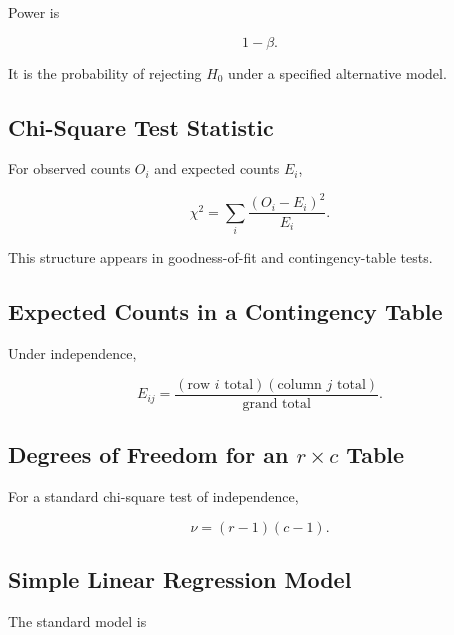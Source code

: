 Power is

\[
\boxed{
1-\beta.
}
\]

It is the probability of rejecting \(H_0\) under a specified alternative
model.

\subsection{Chi-Square Test Statistic}
\label{subsec:chi-square-test-statistic}

For observed counts \(O_i\) and expected counts \(E_i\),

\[
\boxed{
\chi^2
=
\sum_i
\frac{
(O_i-E_i)^2
}{
E_i
}.
}
\]

This structure appears in goodness-of-fit and contingency-table tests.

\subsection{Expected Counts in a Contingency Table}
\label{subsec:contingency-expected-count}

Under independence,

\[
\boxed{
E_{ij}
=
\frac{
(\text{row }i\text{ total})
(\text{column }j\text{ total})
}{
\text{grand total}
}.
}
\]

\subsection{Degrees of Freedom for an \(r\times c\) Table}
\label{subsec:contingency-degrees-freedom}

For a standard chi-square test of independence,

\[
\boxed{
\nu
=
(r-1)(c-1).
}
\]

\subsection{Simple Linear Regression Model}
\label{subsec:simple-linear-regression-reference}

The standard model is

